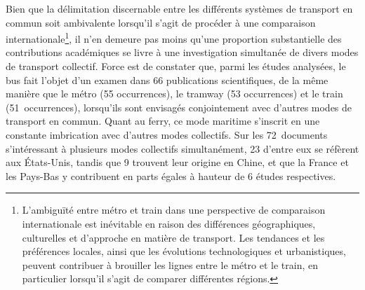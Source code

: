 \begin{refsegment}
Bien que la délimitation discernable entre les différents systèmes de transport en commun soit ambivalente lorsqu'il s'agit de procéder à une comparaison internationale\footnote{
    L'ambiguïté entre métro et train dans une perspective de comparaison internationale est inévitable en raison des différences géographiques, culturelles et d'approche en matière de transport. Les tendances et les préférences locales, ainsi que les évolutions technologiques et urbanistiques, peuvent contribuer à brouiller les lignes entre le métro et le train, en particulier lorsqu'il s'agit de comparer différentes régions.
}, il n'en demeure pas moins qu'une proportion substantielle des contributions académiques se livre à une investigation simultanée de divers modes de transport collectif. Force est de constater que, parmi les études analysées, le bus fait l'objet d'un examen dans 66 publications scientifiques, de la même manière que le métro (55 occurrences), le tramway (53 occurrences) et le train (51~occurrences), lorsqu'ils sont envisagés conjointement avec d'autres modes de transport en commun. Quant au ferry, ce mode maritime s'inscrit en une constante imbrication avec d'autres modes collectifs. Sur les 72~documents s'intéressant à plusieurs modes collectifs simultanément, 23 d'entre eux se réfèrent aux États-Unis, tandis que 9 trouvent leur origine en Chine, et que la France et les Pays-Bas y contribuent en parts égales à hauteur de 6 études respectives.%


\end{refsegment}
